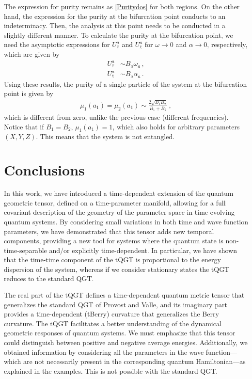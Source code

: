 \documentclass[12pt]{iopart}
\begin{document}
The expression for purity remains as \eqref{Puritydos} for both regions. On the other hand, the expression for the purity at the bifurcation point conducts to an indeterminacy. Then, the analysis at this point needs to be conducted in a slightly different manner. To calculate the purity at the bifurcation point, we need the asymptotic expressions for $U_{{}^\psi}^a$ and $U_{{}^\chi}^a$ for $\omega \to 0$ and $\alpha \to 0$, respectively, which are given by
\begin{subequations}
\begin{align}
    U_{{}^\psi}^a&\sim B_a\omega_a  \,,\\
    U_{{}^\chi}^a&\sim B_a\alpha_a \,.
\end{align}
\end{subequations}
Using these results, the purity of a single particle of the system at the bifurcation point is given by
\begin{align}
\mu_1(a_1) =\mu_2(a_1) \sim \frac{2\sqrt{B_1B_2}}{B_1+B_2}\,,
\end{align}
which is different from zero, unlike the previous case (different frequencies). Notice that if $B_1=B_2$, $\mu_1(a_1)=1$, which also holds for arbitrary parameters $(X,Y,Z)$. This means that the system is not entangled.




\section{Conclusions}\label{sec:conclu}

In this work, we have introduced a time-dependent extension of the quantum geometric tensor, defined on a time-parameter manifold, allowing for a full covariant description of the geometry of the parameter space in time-evolving quantum systems. By considering small variations in both time and wave function parameters, we have demonstrated that this tensor adds new temporal components, providing a new tool for systems where the quantum state is non-time-separable and/or explicitly time-dependent. In particular, we have shown that the time-time component of the tQGT is proportional to the energy dispersion of the system, whereas if we consider stationary states the tQGT reduces to the standard QGT.

The real part of the tQGT defines a time-dependent quantum metric tensor that generalizes the standard QGT of Provost and Valle, and its imaginary part provides a time-dependent (tBerry) curvature that generalizes the Berry curvature. The tQGT facilitates a better understanding of the dynamical geometric responses of quantum systems. We must emphasize that this tensor could distinguish between positive and negative average energies. Additionally, we obtained information by considering all the parameters in the wave function—which are not necessarily present in the corresponding quantum Hamiltonian—as explained in the examples. This is not possible with the standard QGT.
\end{document}
